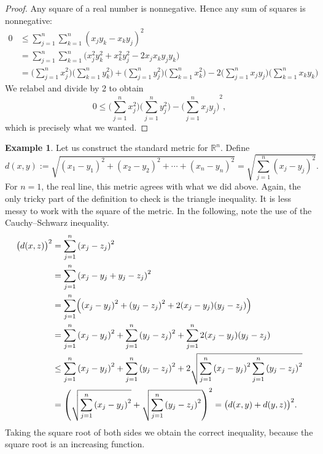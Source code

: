 \documentclass[12pt]{book}
\newcommand{\R}{{\mathbb{R}}}
\theoremstyle{plain}
\theoremstyle{remark}
\theoremstyle{definition}
\theoremstyle{exercise}
\theoremstyle{example}
\newtheorem{example}[thm]{Example}
\begin{document}
\begin{proof}
Any square of a real number is nonnegative.  Hence any sum of squares is
nonnegative:
\begin{equation*}
\begin{split}
0 & \leq 
\sum_{j=1}^n \sum_{k=1}^n {(x_j y_k - x_k y_j)}^2
\\
& =
\sum_{j=1}^n \sum_{k=1}^n \bigl( x_j^2 y_k^2 + x_k^2 y_j^2 - 2 x_j x_k y_j
y_k \bigr)
\\
& =
\biggl( \sum_{j=1}^n x_j^2 \biggr)
\biggl( \sum_{k=1}^n y_k^2 \biggr)
+
\biggl( \sum_{j=1}^n y_j^2 \biggr)
\biggl( \sum_{k=1}^n x_k^2 \biggr)
-
2
\biggl( \sum_{j=1}^n x_j y_j \biggr)
\biggl( \sum_{k=1}^n x_k y_k \biggr)
\end{split}
\end{equation*}
We relabel and divide by 2 to obtain
\begin{equation*}
0 \leq 
\biggl( \sum_{j=1}^n x_j^2 \biggr)
\biggl( \sum_{j=1}^n y_j^2 \biggr)
-
{\biggl( \sum_{j=1}^n x_j y_j \biggr)}^2 ,
\end{equation*}
which is precisely what we wanted.
\end{proof}

\begin{example}
Let us construct the
standard metric\index{standard metric on $\R^n$} for $\R^n$.  Define
\begin{equation*}
d(x,y) :=
\sqrt{
{(x_1-y_1)}^2 + 
{(x_2-y_2)}^2 + 
\cdots +
{(x_n-y_n)}^2
} =
\sqrt{
\sum_{j=1}^n
{(x_j-y_j)}^2 
} .
\end{equation*}
For $n=1$, the real line, this metric agrees with what we did above.  Again,
the only tricky part of the definition to check is the triangle inequality.
It is less messy to work with the square of the metric.  In the
following, note the use of the Cauchy--Schwarz inequality.
\begin{equation*}
\begin{split}
{\bigl(d(x,z)\bigr)}^2 & =
\sum_{j=1}^n
{(x_j-z_j)}^2 
\\
& =
\sum_{j=1}^n
{(x_j-y_j+y_j-z_j)}^2 
\\
& =
\sum_{j=1}^n
\Bigl(
{(x_j-y_j)}^2+{(y_j-z_j)}^2 + 2(x_j-y_j)(y_j-z_j)
\Bigr)
\\
& =
\sum_{j=1}^n
{(x_j-y_j)}^2
+
\sum_{j=1}^n
{(y_j-z_j)}^2 
+
\sum_{j=1}^n
 2(x_j-y_j)(y_j-z_j)
\\
& \leq
\sum_{j=1}^n
{(x_j-y_j)}^2
+
\sum_{j=1}^n
{(y_j-z_j)}^2 
+
2
\sqrt{
\sum_{j=1}^n
{(x_j-y_j)}^2
\sum_{j=1}^n
{(y_j-z_j)}^2
}
\\
& =
{\left(
\sqrt{
\sum_{j=1}^n
{(x_j-y_j)}^2
}
+
\sqrt{
\sum_{j=1}^n
{(y_j-z_j)}^2 
}
\right)}^2
=
{\bigl( d(x,y) + d(y,z) \bigr)}^2 .
\end{split}
\end{equation*}
Taking the square root of both sides we obtain the correct inequality,
because the square root is an increasing function.
\end{example}
\end{document}
